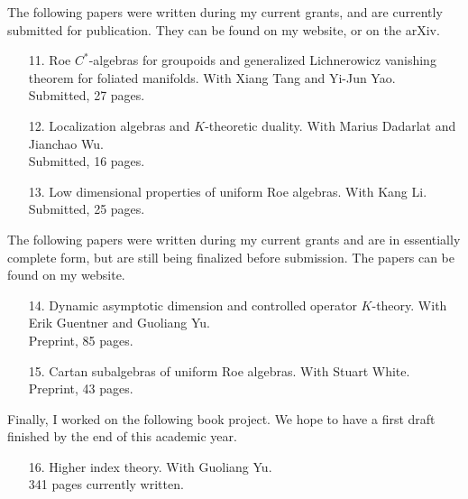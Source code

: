 \documentclass[11pt]{article}
\theoremstyle{plain}
\theoremstyle{definition}
\theoremstyle{remark}
\begin{document}
\noindent The following papers were written during my current grants, and are currently submitted for publication.  They can be found on my website, or on the arXiv.

\begin{enumerate}
\item[11.] Roe $C^*$-algebras for groupoids and generalized Lichnerowicz vanishing theorem for foliated manifolds.  With Xiang Tang and Yi-Jun Yao.\\
{\small Submitted, 27 pages.}
\item[12.] Localization algebras and $K$-theoretic duality.  With Marius Dadarlat and Jianchao Wu.\\
{\small Submitted, 16 pages.}
\item[13.] Low dimensional properties of uniform Roe algebras.  With Kang Li.\\
{\small Submitted, 25 pages.}
\end{enumerate}



\noindent The following papers were written during my current grants and are in essentially complete form, but are still being finalized before submission.  The papers can be found on my website.


\begin{enumerate} 

\item[14.] Dynamic asymptotic dimension and controlled operator $K$-theory.  With Erik Guentner and Guoliang Yu.  \\ {\small Preprint, 85 pages.}


\item[15.] Cartan subalgebras of uniform Roe algebras.  With Stuart White. \\ {\small Preprint, 43 pages}.


\end{enumerate}

Finally, I worked on the following book project.  We hope to have a first draft finished by the end of this academic year.

\begin{enumerate}

\item[16.] Higher index theory.  With Guoliang Yu.\\
{\small 341 pages currently written.}

\end{enumerate}
\end{document}
